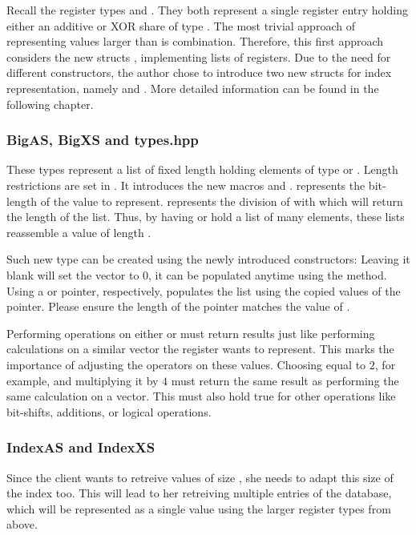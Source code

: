 \label{sub:PossibilityLargerRegisterType}
Recall the register types  and .
They both represent a single register entry holding either an additive or XOR share of type .
The most trivial approach of representing values larger than  is combination.
Therefore, this first approach considers the new structs ,  implementing lists of registers.
Due to the need for different constructors, the author chose to introduce two new structs for index representation, namely  and .
More detailed information can be found in the following chapter.

\subsubsection*{BigAS, BigXS and types.hpp} \label{subsub:BigASandBigXS}
These types represent a list of fixed length holding elements of type  or .
Length restrictions are set in .
It introduces the new macros  and .
 represents the bit-length of the value to represent.
 represents the division of  with  which will return the length of the list.
Thus, by having  or  hold a list of  many elements, these lists reassemble a value of length .

Such new type can be created using the newly introduced constructors:
Leaving it blank will set the vector to 0, it can be populated anytime using the  method.
Using a  or  pointer, respectively, populates the list using the copied values of the pointer.
Please ensure the length of the pointer matches the value of .

Performing operations on either  or  must return results just like performing calculations on a similar vector the register wants to represent.
This marks the importance of adjusting the operators on these values.
Choosing  equal to $2$, for example, and multiplying it by $4$ must return the same result as performing the same calculation on a  vector.
This must also hold true for other operations like bit-shifts, additions, or logical operations.

\subsubsection*{IndexAS and IndexXS} \label{subsub:IndexASandIndexXS}
Since the client wants to retreive values of size , she needs to adapt this size of the index too.
This will lead to her retreiving multiple entries of the database, which will be represented as a single value using the larger register types from above.

